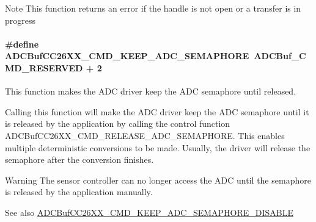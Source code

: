 \begin{DoxyNote}{Note}
This function returns an error if the handle is not open or a transfer is in progress 
\end{DoxyNote}
\paragraph[{A\+D\+C\+Buf\+C\+C26\+X\+X\+\_\+\+C\+M\+D\+\_\+\+K\+E\+E\+P\+\_\+\+A\+D\+C\+\_\+\+S\+E\+M\+A\+P\+H\+O\+R\+E}]{\setlength{\rightskip}{0pt plus 5cm}\#define A\+D\+C\+Buf\+C\+C26\+X\+X\+\_\+\+C\+M\+D\+\_\+\+K\+E\+E\+P\+\_\+\+A\+D\+C\+\_\+\+S\+E\+M\+A\+P\+H\+O\+R\+E~{\bf A\+D\+C\+Buf\+\_\+\+C\+M\+D\+\_\+\+R\+E\+S\+E\+R\+V\+E\+D} + 2}\label{group___a_d_c_buf___c_m_d_ga830dac4199ded43c278e48bb1fe9725e}


This function makes the A\+D\+C driver keep the A\+D\+C semaphore until released. 

Calling this function will make the A\+D\+C driver keep the A\+D\+C semaphore until it is released by the application by calling the control function A\+D\+C\+Buf\+C\+C26\+X\+X\+\_\+\+C\+M\+D\+\_\+\+R\+E\+L\+E\+A\+S\+E\+\_\+\+A\+D\+C\+\_\+\+S\+E\+M\+A\+P\+H\+O\+R\+E. This enables multiple deterministic conversions to be made. Usually, the driver will release the semaphore after the conversion finishes.

\begin{DoxyWarning}{Warning}
The sensor controller can no longer access the A\+D\+C until the semaphore is released by the application manually.
\end{DoxyWarning}
\begin{DoxySeeAlso}{See also}
\hyperlink{group___a_d_c_buf___c_m_d_ga23015764922f21c49518aa1050d70c0e}{A\+D\+C\+Buf\+C\+C26\+X\+X\+\_\+\+C\+M\+D\+\_\+\+K\+E\+E\+P\+\_\+\+A\+D\+C\+\_\+\+S\+E\+M\+A\+P\+H\+O\+R\+E\+\_\+\+D\+I\+S\+A\+B\+L\+E} 
\end{DoxySeeAlso}
